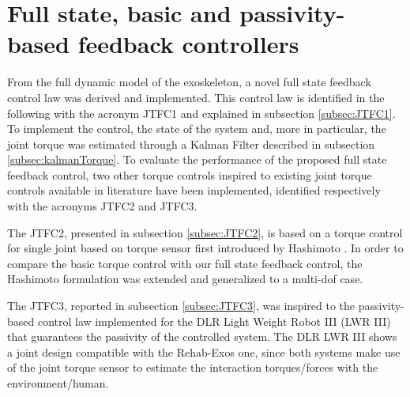 \documentclass[journal]{IEEEtran}
\begin{document}
\section{Full state, basic and passivity-based feedback controllers} 
\label{sec:Full_state_feedback_controllers}

From the full dynamic model of the exoskeleton, a novel  full state feedback control law   was  derived and implemented. This control law is  identified in the following with the acronym JTFC1  and  explained in subsection \ref{subsec:JTFC1}.
To implement the control, the state of the system and, more in particular, the joint torque was estimated through a Kalman Filter described in  subsection \ref{subsec:kalmanTorque}.
To evaluate the performance of  the proposed full state feedback control,  two other torque controls inspired to existing joint torque controls available in literature have been implemented, identified respectively with the acronyms JTFC2 and JTFC3.
\par The JTFC2, presented in subsection \ref{subsec:JTFC2}, is based on a  torque control   for  single joint based on torque sensor first  introduced by Hashimoto \cite{hashimoto1998experimental}. In order to compare the basic torque control with our full state feedback control, the Hashimoto formulation was extended and generalized to a multi-dof case. 
\par The JTFC3, reported in subsection \ref{subsec:JTFC3}, was inspired to the passivity-based control law \cite{kugi2008passivity}
implemented for the DLR Light Weight Robot III (LWR III)   that guarantees the passivity of the controlled system. The DLR LWR III shows a joint design compatible with the Rehab-Exos one, since both systems make use of the joint torque sensor to estimate the interaction torques/forces with the environment/human.
\end{document}
